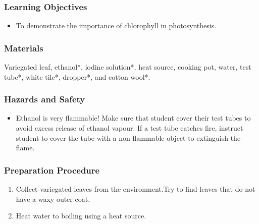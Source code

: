 \subsubsection*{Learning Objectives}
\begin{itemize}
\item{To demonstrate the importance of chlorophyll in photosynthesis.}
\end{itemize}

\subsubsection*{Materials}
Variegated leaf, ethanol*, iodine solution*, heat source, cooking pot, water, test tube*, white tile*, dropper*, and cotton wool*.

\subsubsection*{Hazards and Safety}
\begin{itemize}
\item{Ethanol is very flammable! Make sure that student cover their test tubes to avoid excess release of ethanol vapour. If a test tube catches fire, instruct student to cover the tube with a non-flammable object to extinguish the flame.}
\end{itemize}

\subsubsection*{Preparation Procedure}
\begin{enumerate}
\item{Collect variegated leaves from the environment.Try to find leaves that do not have a waxy outer coat.}
\item{Heat water to boiling using a heat source.}
\end{enumerate}

